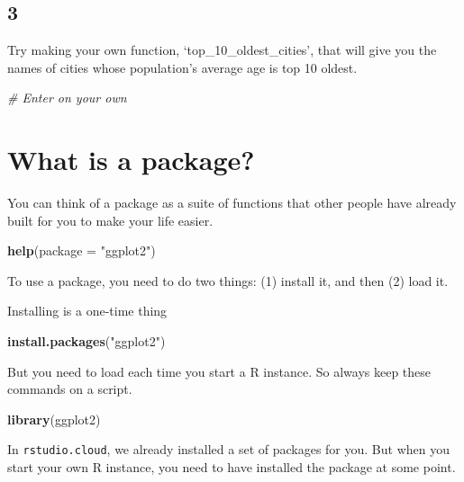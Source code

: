 \documentclass[]{book}
\newenvironment{Shaded}{\begin{snugshade}}{\end{snugshade}}
\newcommand{\KeywordTok}[1]{\textcolor[rgb]{0.13,0.29,0.53}{\textbf{#1}}}
\newcommand{\DataTypeTok}[1]{\textcolor[rgb]{0.13,0.29,0.53}{#1}}
\newcommand{\StringTok}[1]{\textcolor[rgb]{0.31,0.60,0.02}{#1}}
\newcommand{\CommentTok}[1]{\textcolor[rgb]{0.56,0.35,0.01}{\textit{#1}}}
\newcommand{\NormalTok}[1]{#1}
\theoremstyle{definition}
\theoremstyle{definition}
\theoremstyle{definition}
\theoremstyle{remark}
\begin{document}
\subsection*{3}\label{section-16}

Try making your own function, `top\_10\_oldest\_cities', that will give
you the names of cities whose population's average age is top 10 oldest.

\begin{Shaded}
\begin{Highlighting}[]
\CommentTok{# Enter on your own}
\end{Highlighting}
\end{Shaded}

\section{What is a package?}\label{what-is-a-package}

You can think of a package as a suite of functions that other people
have already built for you to make your life easier.

\begin{Shaded}
\begin{Highlighting}[]
\KeywordTok{help}\NormalTok{(}\DataTypeTok{package =} \StringTok{"ggplot2"}\NormalTok{)}
\end{Highlighting}
\end{Shaded}

To use a package, you need to do two things: (1) install it, and then
(2) load it.

Installing is a one-time thing

\begin{Shaded}
\begin{Highlighting}[]
\KeywordTok{install.packages}\NormalTok{(}\StringTok{"ggplot2"}\NormalTok{)}
\end{Highlighting}
\end{Shaded}

But you need to load each time you start a R instance. So always keep
these commands on a script.

\begin{Shaded}
\begin{Highlighting}[]
\KeywordTok{library}\NormalTok{(ggplot2)}
\end{Highlighting}
\end{Shaded}

In \texttt{rstudio.cloud}, we already installed a set of packages for
you. But when you start your own R instance, you need to have installed
the package at some point.
\end{document}
